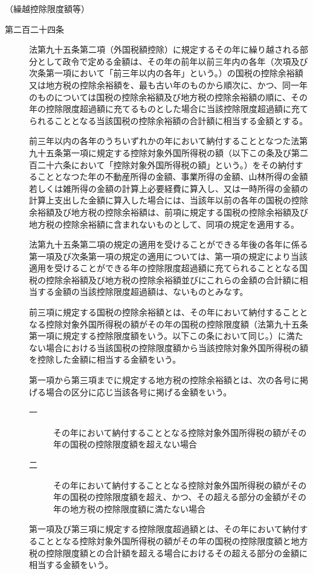 \documentclass[twocolumn,a4j,10pt]{ltjtarticle}
\begin{document}
\noindent\hspace{10pt}（繰越控除限度額等）
\begin{description}
\item[第二百二十四条]法第九十五条第二項（外国税額控除）に規定するその年に繰り越される部分として政令で定める金額は、その年の前年以前三年内の各年（次項及び次条第一項において「前三年以内の各年」という。）の国税の控除余裕額又は地方税の控除余裕額を、最も古い年のものから順次に、かつ、同一年のものについては国税の控除余裕額及び地方税の控除余裕額の順に、その年の控除限度超過額に充てるものとした場合に当該控除限度超過額に充てられることとなる当該国税の控除余裕額の合計額に相当する金額とする。
\item[]前三年以内の各年のうちいずれかの年において納付することとなつた法第九十五条第一項に規定する控除対象外国所得税の額（以下この条及び第二百二十六条において「控除対象外国所得税の額」という。）をその納付することとなつた年の不動産所得の金額、事業所得の金額、山林所得の金額若しくは雑所得の金額の計算上必要経費に算入し、又は一時所得の金額の計算上支出した金額に算入した場合には、当該年以前の各年の国税の控除余裕額及び地方税の控除余裕額は、前項に規定する国税の控除余裕額及び地方税の控除余裕額に含まれないものとして、同項の規定を適用する。
\item[]法第九十五条第二項の規定の適用を受けることができる年後の各年に係る第一項及び次条第一項の規定の適用については、第一項の規定により当該適用を受けることができる年の控除限度超過額に充てられることとなる国税の控除余裕額及び地方税の控除余裕額並びにこれらの金額の合計額に相当する金額の当該控除限度超過額は、ないものとみなす。
\item[]前三項に規定する国税の控除余裕額とは、その年において納付することとなる控除対象外国所得税の額がその年の国税の控除限度額（法第九十五条第一項に規定する控除限度額をいう。以下この条において同じ。）に満たない場合における当該国税の控除限度額から当該控除対象外国所得税の額を控除した金額に相当する金額をいう。
\item[]第一項から第三項までに規定する地方税の控除余裕額とは、次の各号に掲げる場合の区分に応じ当該各号に掲げる金額をいう。
\begin{description}
\item[一]その年において納付することとなる控除対象外国所得税の額がその年の国税の控除限度額を超えない場合
\item[二]その年において納付することとなる控除対象外国所得税の額がその年の国税の控除限度額を超え、かつ、その超える部分の金額がその年の地方税の控除限度額に満たない場合
\end{description}
\item[]第一項及び第三項に規定する控除限度超過額とは、その年において納付することとなる控除対象外国所得税の額がその年の国税の控除限度額と地方税の控除限度額との合計額を超える場合におけるその超える部分の金額に相当する金額をいう。
\end{description}
\end{document}
